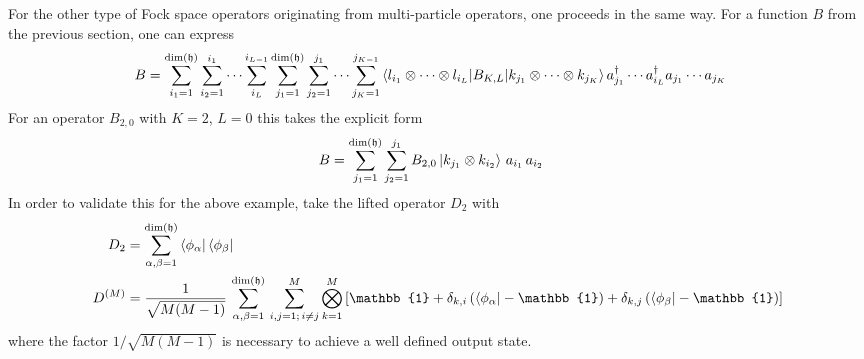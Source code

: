 
For the other type of Fock space operators originating from multi-particle operators, one proceeds in the same way. For a function $B$ from the previous section, one can express
\begin{align*}
    B&= \sum_{i_1=1}^{\text{dim}(\mathfrak{h})}\sum_{i_2=1}^{i_1}\cdots\sum_{i_L}^{i_{L-1}}\sum_{j_1=1}^{\text{dim}(\mathfrak{h})}\sum_{j_2=1}^{j_1}\cdots\sum_{j_K=1}^{j_{K-1}}\braket{l_{i_1}\otimes\cdots\otimes l_{i_L}|B_{K,L}|k_{j_1}\otimes\cdots\otimes k_{j_K}} a_{j_1}^\dagger\cdots a_{i_L}^\dagger a_{j_1}\cdots a_{j_K}
\end{align*}
For an operator $B_{2,0}$ with $K=2$, $L=0$ this takes the explicit form
\begin{align}\label{eq:fock_2body}
    B&= \sum_{j_1=1}^{\text{dim}(\mathfrak{h})}\sum_{j_2=1}^{j_1}B_{2,0}\ket{k_{j_1}\otimes k_{i_2}}\,a_{i_1}\,a_{i_2}
\end{align}
In order to validate this for the above example, take the lifted operator $D_2$ with
\begin{align*}
    D_2&= \sum_{\alpha,\beta=1}^{\text{dim}(\mathfrak{h})}\bra{\phi_\alpha}\bra{\phi_\beta}\\
    D^{(M)}&= \frac{1}{\sqrt{M(M-1)}}\,\sum_{\alpha,\beta=1}^{\text{dim}(\mathfrak{h})}\,\sum_{i,j=1;\,i\neq j}^M\bigotimes_{k=1}^M \left[\mathbb{1}+\delta_{k,i}\,(\bra{\phi_\alpha}-\mathbb{1})+\delta_{k,j}\,(\bra{\phi_\beta}-\mathbb{1})\right]
\end{align*}
where the factor $1/\sqrt{M(M-1)}$ is necessary to achieve a well defined output state. 
